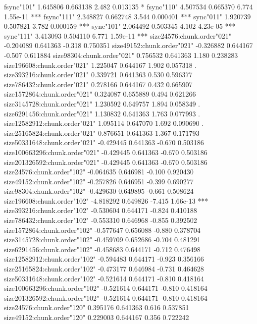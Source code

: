 \documentclass[11pt]{article}
\begin{document}
\begin{Schunk}
\begin{Soutput}
fsync"101"                      1.645806   0.663138   2.482 0.013135 *  
fsync"110"                      4.507534   0.665370   6.774 1.55e-11 ***
fsync"111"                      2.348827   0.662748   3.544 0.000401 ***
sync"011"                       1.920739   0.507821   3.782 0.000159 ***
sync"101"                       2.064492   0.503345   4.102 4.23e-05 ***
sync"111"                       3.413093   0.504110   6.771 1.59e-11 ***
size24576:chunk.order"021"     -0.204089   0.641363  -0.318 0.750351    
size49152:chunk.order"021"     -0.326882   0.644167  -0.507 0.611884    
size98304:chunk.order"021"      0.756532   0.641363   1.180 0.238283    
size196608:chunk.order"021"     1.225047   0.644167   1.902 0.057318 .  
size393216:chunk.order"021"     0.339721   0.641363   0.530 0.596377    
size786432:chunk.order"021"     0.278166   0.644167   0.432 0.665907    
size1572864:chunk.order"021"    0.324087   0.655889   0.494 0.621266    
size3145728:chunk.order"021"    1.230592   0.649757   1.894 0.058349 .  
size6291456:chunk.order"021"    1.130832   0.641363   1.763 0.077993 .  
size12582912:chunk.order"021"   1.095114   0.647070   1.692 0.090690 .  
size25165824:chunk.order"021"   0.876651   0.641363   1.367 0.171793    
size50331648:chunk.order"021"  -0.429445   0.641363  -0.670 0.503186    
size100663296:chunk.order"021" -0.429445   0.641363  -0.670 0.503186    
size201326592:chunk.order"021" -0.429445   0.641363  -0.670 0.503186    
size24576:chunk.order"102"     -0.064635   0.646981  -0.100 0.920430    
size49152:chunk.order"102"     -0.257826   0.646951  -0.399 0.690277    
size98304:chunk.order"102"     -0.429630   0.649895  -0.661 0.508624    
size196608:chunk.order"102"    -4.818292   0.649826  -7.415 1.66e-13 ***
size393216:chunk.order"102"    -0.530604   0.644171  -0.824 0.410188    
size786432:chunk.order"102"    -0.553310   0.646968  -0.855 0.392502    
size1572864:chunk.order"102"   -0.577647   0.656088  -0.880 0.378704    
size3145728:chunk.order"102"   -0.459709   0.652686  -0.704 0.481291    
size6291456:chunk.order"102"   -0.458683   0.644171  -0.712 0.476498    
size12582912:chunk.order"102"  -0.594483   0.644171  -0.923 0.356166    
size25165824:chunk.order"102"  -0.473177   0.646984  -0.731 0.464628    
size50331648:chunk.order"102"  -0.521614   0.644171  -0.810 0.418164    
size100663296:chunk.order"102" -0.521614   0.644171  -0.810 0.418164    
size201326592:chunk.order"102" -0.521614   0.644171  -0.810 0.418164    
size24576:chunk.order"120"      0.395176   0.641363   0.616 0.537851    
size49152:chunk.order"120"      0.229003   0.644167   0.356 0.722242    

\end{Soutput}
\end{Schunk}
\end{document}
